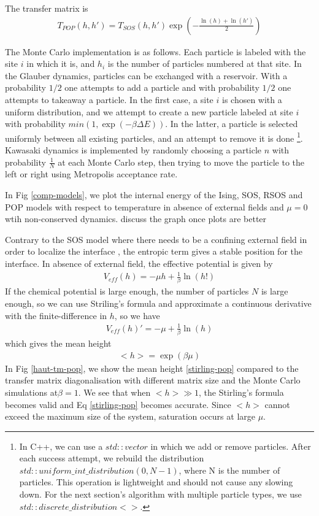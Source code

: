 The transfer matrix is
\begin{align}
T_{POP}(h,h') = T_{SOS}(h,h') \exp \left(- \frac{\ln(h)+\ln(h')}{2} \right)
\end{align}

The Monte Carlo implementation is as follows. Each particle is labeled with the site $i$ in which it is, and $h_i$ is the number of particles numbered at that site. 
In the Glauber dynamics, particles can be exchanged with a reservoir. With a probability $1/2$ one attempts to add a particle and with probability $1/2$ one attempts to takeaway a particle. In the first case, a site $i$ is chosen with a uniform distribution, and we attempt to create a new particle labeled at site $i$ with probability $min(1,\exp(-\beta \Delta E))$. In the latter, a particle is selected uniformly between all existing particles, and an attempt to remove it is done
\footnote{In C++, we can use a $std::vector$ in which we add or remove particles. After each success attempt, we rebuild the distribution $std::uniform\_int\_distribution(0,N-1)$, where N is the number of particles. This operation is lightweight and should not cause any slowing down. For the next section's algorithm with multiple particle types, we use $std::discrete\_distribution<>$. }.
Kawasaki dynamics is implemented by randomly choosing a particle $n$ with probability $\frac{1}{N}$ at each Monte Carlo step, then trying to move the particle to the left or right using Metropolis acceptance rate. 

In Fig \ref{comp-models}, we plot the internal energy of the Ising, SOS, RSOS and POP models with respect to temperature in absence of external fields and $\mu=0$ wtih non-conserved dynamics. {\color{red} discuss the graph once plots are better}

Contrary to the SOS model where there needs to be a confining external field in order to localize the interface \cite{burkhardt_localisation-delocalisation_1981,chui_pinning_1981}, the entropic term gives a stable position for the interface. In absence of external field, the effective potential is given by
\begin{align} 
    V_{eff}(h) = - \mu h + \frac{1}{\beta}\ln(h!)
\end{align}
If the chemical potential is large enough, the number of particles $N$ is large enough, so we can use Striling's formula and approximate a continuous derivative with the finite-difference in $h$, so we have
\begin{align} 
    V_{eff}(h)' = - \mu +\frac{1}{\beta} \ln(h)
\end{align}which gives the mean height 
\begin{align} 
    <h> = \exp(\beta \mu) 
\label{stirling-pop}
    \end{align}
    In Fig \ref{haut-tm-pop}, we show the mean height \eqref{stirling-pop} compared to the transfer matrix diagonalisation with different matrix size and the Monte Carlo simulations at$\beta=1$. We see that when $ <h> \gg 1$, the Stirling's formula becomes valid and Eq \eqref{stirling-pop} becomes accurate. Since $<h>$ cannot exceed the maximum size of the system, saturation occurs at large $\mu$. 


